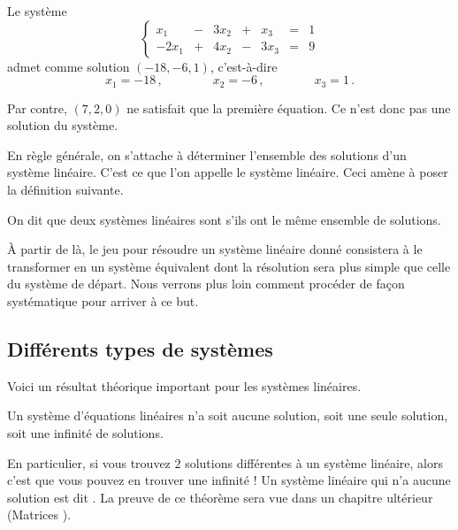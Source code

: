 \documentclass[class=report,crop=false]{standalone}
\begin{document}
\begin{exemple}
 Le système
\[ \left\{  \begin{array}{ccccccc}
 x_1 &- &3x_2 &+ &x_3 & =  &1\\
 -2x_1 &+ &4x_2 &- &3x_3 & =  &9
 \end{array} \right .
\]
admet comme solution $(-18,-6,1)$, c'est-à-dire
$$ x_1=-18\, , \qquad\qquad x_2 = -6\, , \qquad\qquad x_3 = 1\, .$$

Par contre, $(7,2,0)$ ne satisfait que la première équation.
Ce n'est donc pas une solution du système.
\end{exemple}

En règle générale, on s'attache à déterminer l'ensemble
des solutions d'un système linéaire. C'est ce que l'on appelle 
le système linéaire.
Ceci amène à poser la définition suivante.

\begin{definition}
\label{systemes equivalents}
On dit que deux systèmes linéaires sont 
s'ils ont le même ensemble de solutions.
\end{definition}


{\`A} partir de là, le jeu pour résoudre un système linéaire
donné consistera à le transformer en un système équivalent dont
la résolution sera plus simple que celle du système de départ.
Nous verrons plus loin comment procéder de façon systématique pour arriver à ce but.

\subsection{Différents types de systèmes}

Voici un résultat théorique important pour les systèmes linéaires.
\begin{theoreme}
Un système d'équations linéaires n'a soit aucune solution,
soit une seule solution, soit une infinité de solutions.
\end{theoreme}


En particulier, si vous trouvez $2$ solutions différentes à un système
linéaire, alors c'est que vous pouvez en trouver une infinité !
Un système linéaire qui n'a aucune solution est dit .
La preuve de ce théorème sera vue dans un chapitre ultérieur
(\og Matrices \fg).

\end{document}
